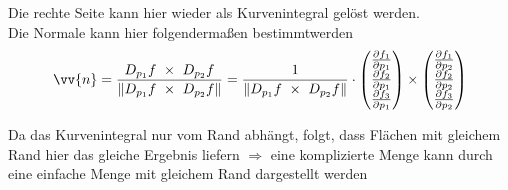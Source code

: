 Die rechte Seite kann hier wieder als Kurvenintegral gelöst werden.\\
Die Normale kann hier folgendermaßen bestimmtwerden
\begin{equation}
    \vv{n} = \frac{D_{p_1}f \ \times \ D_{p_2}f}{\norm{D_{p_1}f \ \times \ D_{p_2}f}} = \frac{1}{\norm{D_{p_1}f \ \times \ D_{p_2}f}} \cdot  \begin{pmatrix} \frac{\partial f_1}{\partial p_1} \\\frac{\partial f_2}{\partial p_1} \\ \frac{\partial f_3}{\partial p_1}  \end{pmatrix} \times \begin{pmatrix} \frac{\partial f_1}{\partial p_2} \\\frac{\partial f_2}{\partial p_2} \\ \frac{\partial f_3}{\partial p_2}  \end{pmatrix}
\end{equation}

Da das Kurvenintegral nur vom Rand abhängt, folgt, dass Flächen mit gleichem Rand hier das gleiche Ergebnis liefern $\Rightarrow$ eine komplizierte Menge kann durch eine einfache Menge mit gleichem Rand dargestellt werden
